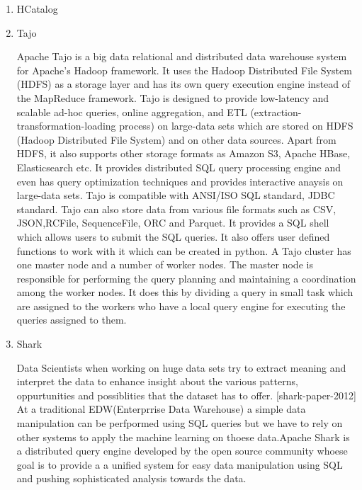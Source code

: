 \begin{enumerate}
\item {} 
HCatalog

\item {} 
Tajo

Apache Tajo \label{\detokenize{i524/technologies:id210}}{\hyperref[\detokenize{i524/technologies:www-apache-tajo}]{\sphinxcrossref{{[}180{]}}}} is a big data relational and
distributed data warehouse system for Apache's Hadoop
framework. It uses the Hadoop Distributed File System (HDFS) as a
storage layer and has its own query execution engine instead of
the MapReduce framework. Tajo is designed to provide low-latency
and scalable ad-hoc queries, online aggregation, and ETL
(extraction-transformation-loading process) on large-data sets
which are stored on HDFS (Hadoop Distributed File System) and on
other data sources. \label{\detokenize{i524/technologies:id211}}{\hyperref[\detokenize{i524/technologies:www-tutorialspoint-tajo}]{\sphinxcrossref{{[}181{]}}}} Apart from HDFS,
it also supports other storage formats as Amazon S3, Apache
HBase, Elasticsearch etc. It provides distributed SQL query
processing engine and even has query optimization techniques and
provides interactive anaysis on large-data sets. Tajo is
compatible with ANSI/ISO SQL standard, JDBC standard. Tajo can
also store data from various file formats such as CSV,
JSON,RCFile, SequenceFile, ORC and Parquet. It provides a SQL
shell which allows users to submit the SQL queries. It also
offers user defined functions to work with it which can be
created in python. A Tajo cluster has one master node and a
number of worker nodes. \label{\detokenize{i524/technologies:id212}}{\hyperref[\detokenize{i524/technologies:www-tutorialspoint-tajo}]{\sphinxcrossref{{[}181{]}}}} The master
node is responsible for performing the query planning and
maintaining a coordination among the worker nodes. It does this
by dividing a query in small task which are assigned to the
workers who have a local query engine for executing the queries
assigned to them.

\item {} 
Shark

Data Scientists when working on huge data sets try to extract
meaning and interpret the data to enhance insight about the
various patterns, oppurtunities and possiblities that the dataset
has to offer. {[}shark-paper-2012{]} At a traditional
EDW(Enterprrise Data Warehouse) a simple data manipulation can be
perfpormed using SQL queries but we have to rely on other systems
to apply the machine learning on thoese data.Apache Shark is a
distributed query engine developed by the open source community
whoese goal is to provide a a unified system for easy data
manipulation using SQL and pushing sophisticated analysis towards
the data.


\end{enumerate}
